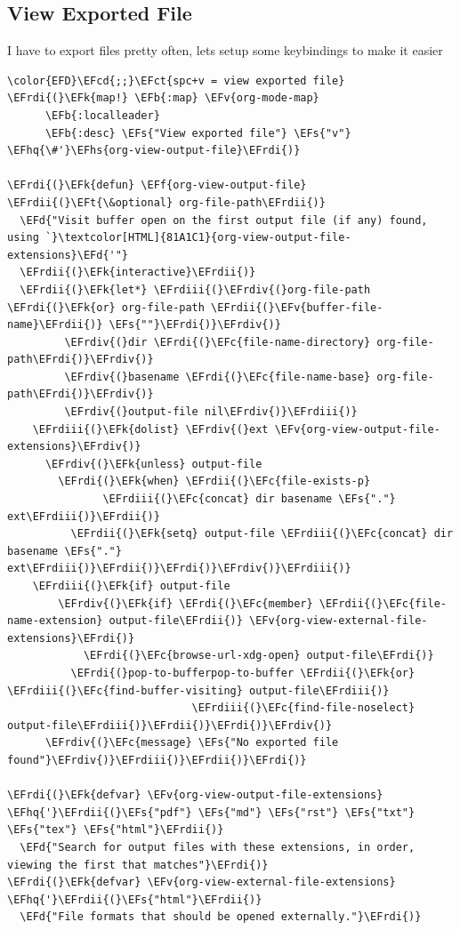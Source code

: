 \documentclass{scrartcl}
\newcommand{\EFk}[1]{\textcolor{EFk}{#1}} %
\newcommand{\EFd}[1]{\textcolor{EFd}{#1}} %
\newcommand{\EFt}[1]{\textcolor{EFt}{#1}} %
\newcommand{\EFs}[1]{\textcolor{EFs}{#1}} %
\newcommand{\EFb}[1]{\textcolor{EFb}{#1}} %
\newcommand{\EFct}[1]{\textcolor{EFct}{#1}} %
\newcommand{\EFc}[1]{\textcolor{EFc}{#1}} %
\newcommand{\EFv}[1]{\textcolor{EFv}{#1}} %
\newcommand{\EFf}[1]{\textcolor{EFf}{#1}} %
\newcommand{\EFcd}[1]{\textcolor{EFcd}{#1}} %
\newcommand{\EFhq}[1]{#1} %
\newcommand{\EFhs}[1]{#1} %
\newcommand{\EFrdi}[1]{#1} %
\newcommand{\EFrdii}[1]{#1} %
\newcommand{\EFrdiii}[1]{#1} %
\newcommand{\EFrdiv}[1]{#1} %
\begin{document}
\subsection{View Exported File}
\label{sec:org063f1d9}
I have to export files pretty often, lets setup some keybindings to make it easier
\begin{Code}
\begin{Verbatim}[]
\color{EFD}\EFcd{;;}\EFct{spc+v = view exported file}
\EFrdi{(}\EFk{map!} \EFb{:map} \EFv{org-mode-map}
      \EFb{:localleader}
      \EFb{:desc} \EFs{"View exported file"} \EFs{"v"} \EFhq{\#'}\EFhs{org-view-output-file}\EFrdi{)}

\EFrdi{(}\EFk{defun} \EFf{org-view-output-file} \EFrdii{(}\EFt{\&optional} org-file-path\EFrdii{)}
  \EFd{"Visit buffer open on the first output file (if any) found, using `}\textcolor[HTML]{81A1C1}{org-view-output-file-extensions}\EFd{'"}
  \EFrdii{(}\EFk{interactive}\EFrdii{)}
  \EFrdii{(}\EFk{let*} \EFrdiii{(}\EFrdiv{(}org-file-path \EFrdi{(}\EFk{or} org-file-path \EFrdii{(}\EFv{buffer-file-name}\EFrdii{)} \EFs{""}\EFrdi{)}\EFrdiv{)}
         \EFrdiv{(}dir \EFrdi{(}\EFc{file-name-directory} org-file-path\EFrdi{)}\EFrdiv{)}
         \EFrdiv{(}basename \EFrdi{(}\EFc{file-name-base} org-file-path\EFrdi{)}\EFrdiv{)}
         \EFrdiv{(}output-file nil\EFrdiv{)}\EFrdiii{)}
    \EFrdiii{(}\EFk{dolist} \EFrdiv{(}ext \EFv{org-view-output-file-extensions}\EFrdiv{)}
      \EFrdiv{(}\EFk{unless} output-file
        \EFrdi{(}\EFk{when} \EFrdii{(}\EFc{file-exists-p}
               \EFrdiii{(}\EFc{concat} dir basename \EFs{"."} ext\EFrdiii{)}\EFrdii{)}
          \EFrdii{(}\EFk{setq} output-file \EFrdiii{(}\EFc{concat} dir basename \EFs{"."} ext\EFrdiii{)}\EFrdii{)}\EFrdi{)}\EFrdiv{)}\EFrdiii{)}
    \EFrdiii{(}\EFk{if} output-file
        \EFrdiv{(}\EFk{if} \EFrdi{(}\EFc{member} \EFrdii{(}\EFc{file-name-extension} output-file\EFrdii{)} \EFv{org-view-external-file-extensions}\EFrdi{)}
            \EFrdi{(}\EFc{browse-url-xdg-open} output-file\EFrdi{)}
          \EFrdi{(}pop-to-bufferpop-to-buffer \EFrdii{(}\EFk{or} \EFrdiii{(}\EFc{find-buffer-visiting} output-file\EFrdiii{)}
                             \EFrdiii{(}\EFc{find-file-noselect} output-file\EFrdiii{)}\EFrdii{)}\EFrdi{)}\EFrdiv{)}
      \EFrdiv{(}\EFc{message} \EFs{"No exported file found"}\EFrdiv{)}\EFrdiii{)}\EFrdii{)}\EFrdi{)}

\EFrdi{(}\EFk{defvar} \EFv{org-view-output-file-extensions} \EFhq{'}\EFrdii{(}\EFs{"pdf"} \EFs{"md"} \EFs{"rst"} \EFs{"txt"} \EFs{"tex"} \EFs{"html"}\EFrdii{)}
  \EFd{"Search for output files with these extensions, in order, viewing the first that matches"}\EFrdi{)}
\EFrdi{(}\EFk{defvar} \EFv{org-view-external-file-extensions} \EFhq{'}\EFrdii{(}\EFs{"html"}\EFrdii{)}
  \EFd{"File formats that should be opened externally."}\EFrdi{)}
\end{Verbatim}
\end{Code}
\end{document}
